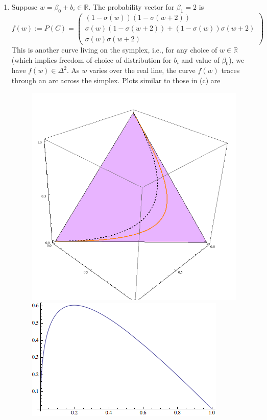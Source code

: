 \documentclass[11pt]{article}
\newcommand{\R}{\mathbb{R}}
\begin{document}
\begin{enumerate}
\begin{enumerate}
			\item Suppose $w=\beta_0+b_i\in \R$. The probability vector for $\beta_1=2$ is
			\[
				f(w):=P(C) = \begin{pmatrix}
				(1-\sigma(w))(1-\sigma(w+2)) \\
				\sigma(w)(1-\sigma(w+2)) + (1-\sigma(w))\sigma(w+2) \\
				\sigma(w)\sigma(w+2)
				\end{pmatrix}
			\]
			This is another curve living on the symplex, i.e., for any choice of $w\in \R$ (which implies freedom of choice of distribution for $b_i$ and value of $\beta_0$), we have $f(w) \in \Delta^2$. As $w$ varies over the real line, the curve $f(w)$ traces through an arc across the simplex. Plots similar to those in (c) are
			\begin{figure}[H]
				\includegraphics[scale=0.5]{plot2.png}
				\includegraphics[scale=0.5]{projplot2d1}

\end{figure}
\end{enumerate}
\end{enumerate}
\end{document}

